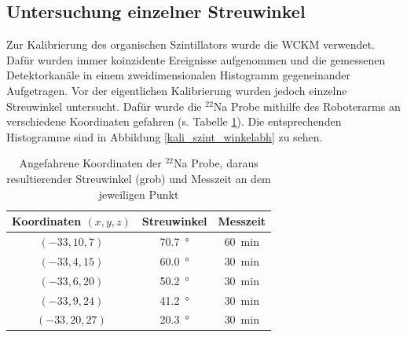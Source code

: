 \subsection{Untersuchung einzelner Streuwinkel}

Zur Kalibrierung des organischen Szintillators wurde die WCKM verwendet. Dafür wurden immer koinzidente Ereignisse aufgenommen und die gemessenen Detektorkanäle in einem zweidimensionalen Histogramm gegeneinander Aufgetragen. Vor der eigentlichen Kalibrierung wurden jedoch einzelne Streuwinkel untersucht. Dafür wurde die $^{22}$Na Probe mithilfe des Roboterarms an verschiedene Koordinaten gefahren (s. Tabelle \ref{kali_szint_coords}). Die entsprechenden Histogramme sind in Abbildung \ref{kali_szint_winkelabh} zu sehen.

\begin{table}[h]
    \centering
    \begin{tabular}{|c | c |c |}
        \hline
        Koordinaten $(x,y,z)$  & Streuwinkel & Messzeit \\
        \hline
        $(-33, 10, 7)$ & \SI{70.7}{\degree} & \SI{60}{\minute} \\
        $(-33, 4, 15)$ & \SI{60.0}{\degree} & \SI{30}{\minute} \\
        $(-33, 6, 20)$ & \SI{50.2}{\degree} & \SI{30}{\minute} \\
        $(-33, 9, 24)$ & \SI{41.2}{\degree} & \SI{30}{\minute} \\
        $(-33, 20, 27)$ & \SI{20.3}{\degree} & \SI{30}{\minute} \\
        \hline
    \end{tabular}
    \caption{Angefahrene Koordinaten der $^{22}$Na Probe, daraus resultierender Streuwinkel (grob) und Messzeit an dem jeweiligen Punkt}
    \label{kali_szint_coords}
\end{table}

